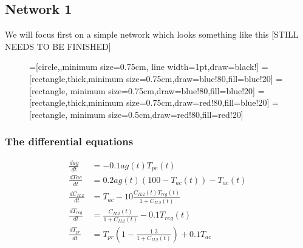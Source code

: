 \subsection{\label{sec:net1}Network 1}

We will focus first on a simple network which looks something like this [STILL NEEDS TO BE FINISHED]

\begin{figure}[h]
=[circle,,minimum size=0.75cm, line width=1pt,draw=black!]
=[rectangle,thick,minimum size=0.75cm,draw=blue!80,fill=blue!20]
=[rectangle, minimum size=0.75cm,draw=blue!80,fill=blue!20]
=[rectangle,thick,minimum size=0.75cm,draw=red!80,fill=blue!20]
=[rectangle, minimum size=0.5cm,draw=red!80,fill=red!20]
\end{figure}

\subsubsection{\label{sec:eq1}The differential equations}

\begin{equation}
\begin{aligned}
\frac{d ag}{dt} & = -0.1 ag(t) T_{pr}(t)\\
\frac{d T{ac}}{dt} & = 0.2 ag(t) ( 100 - T_{ac}(t) ) - T_{ac}(t)\\
\frac{d C_{IL2}}{dt} & = T_{ac} - 10\frac{ C_{IL2}(t)  T_{reg}(t) }{ 1 + C_{IL2}(t) }\\
\frac{d T_{reg}}{dt} & = \frac{ C_{IL2}(t) }{1 + C_{IL2}(t)} - 0.1 T_{reg}(t)\\
\frac{d T_{pr}}{dt} & = T_{pr} ( 1-\frac{1.3}{1+C_{IL2}(t)} ) + 0.1 T_{ac}
\end{aligned}
\label{me1}
\end{equation}

